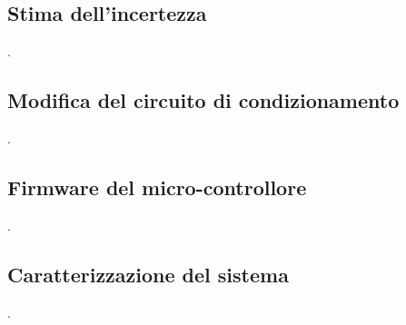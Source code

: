 \documentclass[a4paper]{article}
\begin{document}
		\subsection{Stima dell'incertezza}
			.
		\subsection{Modifica del circuito di condizionamento}
			.
		\subsection{Firmware del micro-controllore}
			.
		\subsection{Caratterizzazione del sistema}
			.
\end{document}
